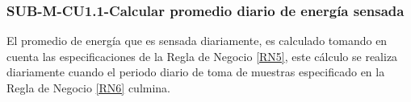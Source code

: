 \subsubsection{SUB-M-CU1.1-Calcular promedio diario de energía sensada}\label{SUB-M-CU1.1}
El promedio de energía que es sensada diariamente, es calculado tomando en cuenta las especificaciones de la Regla de Negocio \ref{RN5}, este cálculo se realiza diariamente cuando el periodo diario de toma de muestras especificado en la Regla de Negocio \ref{RN6} culmina.
